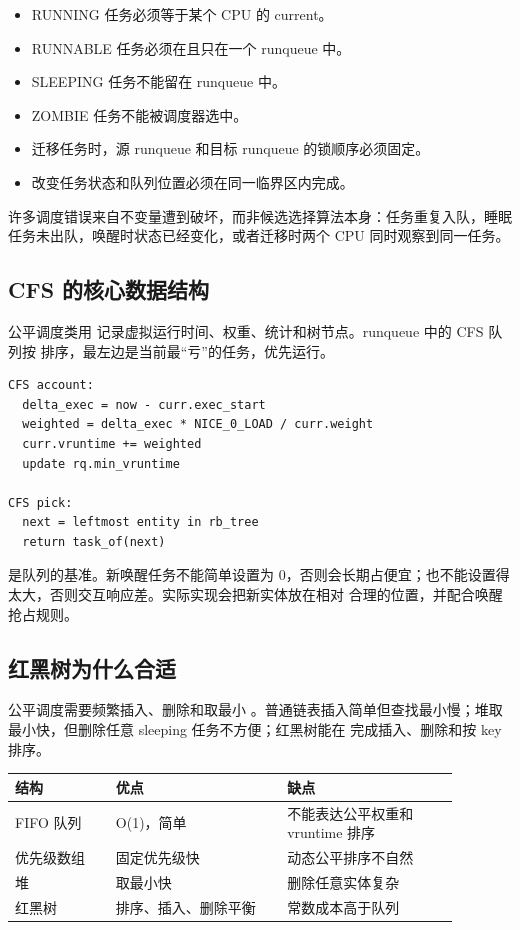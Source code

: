 \begin{rubricbox}
\begin{itemize}
\tightlist
\item RUNNING 任务必须等于某个 CPU 的 current。
\item RUNNABLE 任务必须在且只在一个 runqueue 中。
\item SLEEPING 任务不能留在 runqueue 中。
\item ZOMBIE 任务不能被调度器选中。
\item 迁移任务时，源 runqueue 和目标 runqueue 的锁顺序必须固定。
\item 改变任务状态和队列位置必须在同一临界区内完成。
\end{itemize}
\end{rubricbox}

许多调度错误来自不变量遭到破坏，而非候选选择算法本身：任务重复入队，睡眠任务未出队，唤醒时状态已经变化，或者迁移时两个 CPU 同时观察到同一任务。

\subsection{CFS 的核心数据结构}

公平调度类用  记录虚拟运行时间、权重、统计和树节点。runqueue 中的 CFS 队列按  排序，最左边是当前最“亏”的任务，优先运行。

\begin{lstlisting}
CFS account:
  delta_exec = now - curr.exec_start
  weighted = delta_exec * NICE_0_LOAD / curr.weight
  curr.vruntime += weighted
  update rq.min_vruntime

CFS pick:
  next = leftmost entity in rb_tree
  return task_of(next)
\end{lstlisting}

 是队列的基准。新唤醒任务不能简单设置为 0，否则会长期占便宜；也不能设置得太大，否则交互响应差。实际实现会把新实体放在相对  合理的位置，并配合唤醒抢占规则。

\subsection{红黑树为什么合适}

公平调度需要频繁插入、删除和取最小 。普通链表插入简单但查找最小慢；堆取最小快，但删除任意 sleeping 任务不方便；红黑树能在  完成插入、删除和按 key 排序。

\begin{longtable}{|p{0.2\linewidth}|p{0.34\linewidth}|p{0.34\linewidth}|}
\toprule
结构 & 优点 & 缺点 \\
\midrule
FIFO 队列 & O(1)，简单 & 不能表达公平权重和 vruntime 排序 \\\tablerowrule
优先级数组 & 固定优先级快 & 动态公平排序不自然 \\\tablerowrule
堆 & 取最小快 & 删除任意实体复杂 \\\tablerowrule
红黑树 & 排序、插入、删除平衡 & 常数成本高于队列 \\
\bottomrule
\end{longtable}

